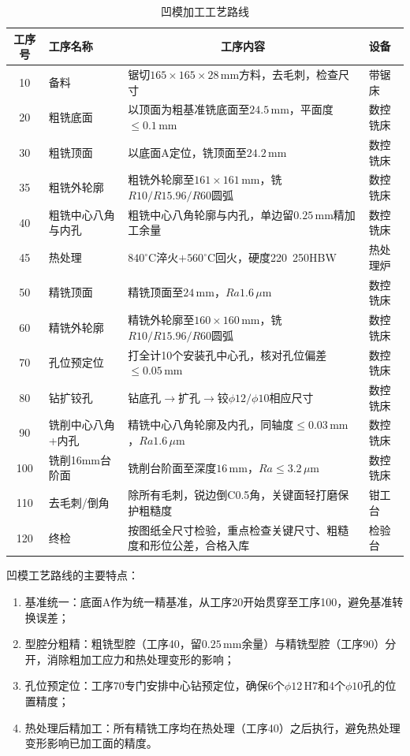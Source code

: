 \documentclass{xautCADreport}
\begin{document}
\begin{table}[H]
  \centering
  \caption{凹模加工工艺路线}
  \label{tab:route_die}
  \small
  \begin{tabular}{clp{7.5cm}l}
    \toprule
    工序号 & 工序名称 & \multicolumn{1}{c}{工序内容} & 设备 \\
    \midrule
    10 & 备料 & 锯切$165\times165\times28\,\mathrm{mm}$方料，去毛刺，检查尺寸 & 带锯床 \\
    20 & 粗铣底面 & 以顶面为粗基准铣底面至$24.5\,\mathrm{mm}$，平面度$\leq0.1\,\mathrm{mm}$ & 数控铣床 \\
    30 & 粗铣顶面 & 以底面A定位，铣顶面至$24.2\,\mathrm{mm}$ & 数控铣床 \\
    35 & 粗铣外轮廓 & 粗铣外轮廓至$161\times161\,\mathrm{mm}$，铣$R10/R15.96/R60$圆弧 & 数控铣床 \\
    40 & 粗铣中心八角与内孔 & 粗铣中心八角轮廓与内孔，单边留$0.25\,\mathrm{mm}$精加工余量 & 数控铣床 \\
    45 & 热处理 & $840^{\circ}\mathrm{C}$淬火$+560^{\circ}\mathrm{C}$回火，硬度220~250HBW & 热处理炉 \\
    50 & 精铣顶面 & 精铣顶面至$24\,\mathrm{mm}$，$Ra1.6\,\mu\mathrm{m}$ & 数控铣床 \\
    60 & 精铣外轮廓 & 精铣外轮廓至$160\times160\,\mathrm{mm}$，铣$R10/R15.96/R60$圆弧 & 数控铣床 \\
    70 & 孔位预定位 & 打全计10个安装孔中心孔，核对孔位偏差$\leq0.05\,\mathrm{mm}$ & 数控铣床 \\
    80 & 钻扩铰孔 & 钻底孔$\to$扩孔$\to$铰$\phi12/\phi10$相应尺寸 & 数控铣床 \\
    90 & 铣削中心八角+内孔 & 精铣中心八角轮廓及内孔，同轴度$\leq0.03\,\mathrm{mm}$，$Ra1.6\,\mu\mathrm{m}$ & 数控铣床 \\
    100 & 铣削16mm台阶面 & 铣削台阶面至深度$16\,\mathrm{mm}$，$Ra\leq3.2\,\mu\mathrm{m}$ & 数控铣床 \\
    110 & 去毛刺/倒角 & 除所有毛刺，锐边倒C0.5角，关键面轻打磨保护粗糙度 & 钳工台 \\
    120 & 终检 & 按图纸全尺寸检验，重点检查关键尺寸、粗糙度和形位公差，合格入库 & 检验台 \\
    \bottomrule
  \end{tabular}
\end{table}

凹模工艺路线的主要特点：
\begin{enumerate}
  \item 基准统一：底面A作为统一精基准，从工序20开始贯穿至工序100，避免基准转换误差；
  \item 型腔分粗精：粗铣型腔（工序40，留$0.25\,\mathrm{mm}$余量）与精铣型腔（工序90）分开，消除粗加工应力和热处理变形的影响；
  \item 孔位预定位：工序70专门安排中心钻预定位，确保6个$\phi12\,\mathrm{H7}$和4个$\phi10$孔的位置精度；
  \item 热处理后精加工：所有精铣工序均在热处理（工序40）之后执行，避免热处理变形影响已加工面的精度。
\end{enumerate}
\end{document}
